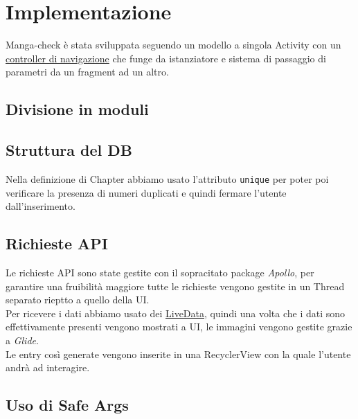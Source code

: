 \documentclass[../Assignment-3-LPSMT.tex]{subfiles}
\begin{document}
\chapter{Implementazione}

Manga-check è stata sviluppata seguendo un modello a singola Activity con un
\href{https://developer.android.com/guide/navigation}{controller di navigazione}
che funge da istanziatore e sistema di passaggio di parametri da un fragment ad un altro.\\

\section{Divisione in moduli}

\section{Struttura del DB}





Nella definizione di Chapter abbiamo usato l'attributo \texttt{unique} per poter poi verificare la presenza di numeri duplicati e quindi fermare l'utente dall'inserimento.

\section{Richieste API}

Le richieste API sono state gestite con il sopracitato package \emph{Apollo}, per garantire una fruibilità maggiore tutte le richieste vengono gestite in un Thread separato rieptto a quello della UI.\\
Per ricevere i dati abbiamo usato dei \href{https://developer.android.com/reference/kotlin/androidx/lifecycle/LiveData}{LiveData}, quindi una volta che i dati sono effettivamente presenti vengono mostrati a UI, le immagini vengono gestite grazie a \emph{Glide}.\\
Le entry così generate vengono inserite in una RecyclerView con la quale l'utente andrà ad interagire.



\section{Uso di Safe Args}
\end{document}
